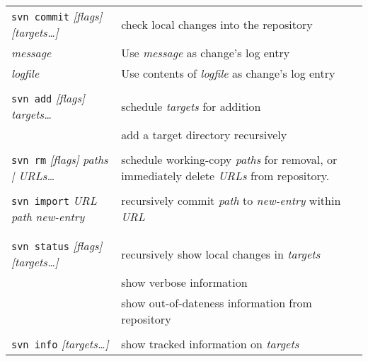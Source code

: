 \documentclass{report}
\begin{document}
\begin{tabular}{lp{2.8in}p{2.0in}}
\\
{\tt svn commit} {\sl [flags]} {\sl [targets\dots]}	&
check local changes into the repository		&  \\

\hspace{0.5in}{\tt -m} {\sl message}		&
Use {\sl message} as change's log entry		& \\

\hspace{0.5in}{\tt -F} {\sl logfile}		&
Use contents of {\sl logfile} as change's log entry		& \\

\\
{\tt svn add} {\sl [flags]} {\sl targets\dots}    &
schedule {\sl targets} for addition		        & \\

\hspace{0.5in}{\tt --recursive}		&
add a target directory recursively	& \\

\\
{\tt svn rm} {\sl [flags]} {\sl paths | URLs\dots}	&
schedule working-copy {\sl paths} for removal,
or immediately delete {\sl URLs} from repository.	& \\

\\
{\tt svn import} {\sl URL} {\sl path} {\sl new-entry}	&
recursively commit {\sl path} to {\sl new-entry} within {\sl URL} &\\

\\
\vspace{0.1in} \hspace{-0.1in}{\bf\Large Working Copy Maintenance} \\

{\tt svn status} {\sl [flags]} {\sl [targets\dots]}	&
recursively show local changes in {\sl targets} &  \\

\hspace{0.5in}{\tt -v}		&
show verbose information		&  \\

\hspace{0.5in}{\tt -u}		&
show out-of-dateness information from repository		&  \\

\\
{\tt svn info} {\sl [targets\dots]}	&
show tracked information on {\sl targets} &  \\


\end{tabular}
\end{document}
